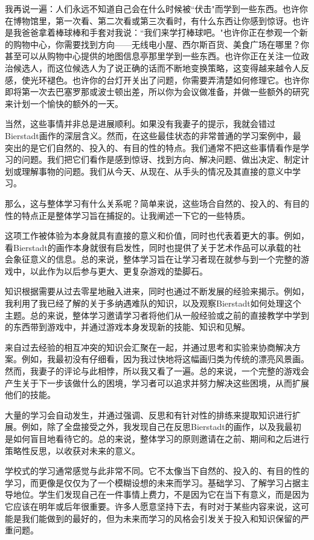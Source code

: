 我再说一遍：人们永远不知道自己会在什么时候被``伏击"而学到一些东西。也许你在博物馆里，第一次看、第二次看或第三次看时，有什么东西让你感到惊讶。也许是我爸爸拿着棒球棒和手套对我说：``我们来学打棒球吧。"也许你正在参观一个新的购物中心，你需要找到方向——无线电小屋、西尔斯百货、美食广场在哪里？你甚至可以从购物中心提供的地图信息亭那里学到一些东西。也许你正在关注一位政治候选人，而这位候选人为了说正确的话而不断地变换策略，这变得越来越令人反感，使光环褪色。也许你的台灯开关出了问题，你需要弄清楚如何修理它。也许你即将第一次去巴塞罗那或波士顿出差，所以你为会议做准备，并做一些额外的研究来计划一个愉快的额外的一天。

当然，这些事情并非总是进展顺利。如果没有我妻子的提示，我就会错过Bierstadt画作的深层含义。然而，在这些最佳状态的非常普通的学习案例中，最突出的是它们自然的、投入的、有目的性的特点。我们通常不把这些事情看作是学习的问题。我们把它们看作是感到惊讶、找到方向、解决问题、做出决定、制定计划或理解事物的问题。我们从今天、从现在、从手头的情况及其直接的意义中学习。

那么，这与整体学习有什么关系呢？简单来说，这些场合自然的、投入的、有目的性的特点正是整体学习旨在捕捉的。让我阐述一下它的一些特质。

这项工作被体验为本身就具有直接的意义和价值，同时也代表着更大的事。例如，看Bierstadt的画作本身就很有启发性，同时也提供了关于艺术作品可以承载的社会象征意义的信息。总的来说，整体学习旨在让学习者现在就参与到一个完整的游戏中，以此作为以后参与更大、更复杂游戏的垫脚石。

知识根据需要从过去零星地融入进来，同时也通过不断发展的经验来揭示。例如，我利用了我已经了解的关于多纳遇难队的知识，以及观察Bierstadt如何处理这个主题。总的来说，整体学习邀请学习者将他们从一般经验或之前的直接教学中学到的东西带到游戏中，并通过游戏本身发现新的技能、知识和见解。

来自过去经验的相互冲突的知识会汇聚在一起，并通过思考和实验来协商解决方案。例如，我最初没有仔细看，因为我过快地将这幅画归类为传统的漂亮风景画。然而，我妻子的评论与此相悖，所以我又看了一遍。总的来说，一个完整的游戏会产生关于下一步该做什么的困境，学习者可以追求并努力解决这些困境，从而扩展他们的技能。

大量的学习会自动发生，并通过强调、反思和有针对性的排练来提取知识进行扩展。例如，除了全盘接受之外，我发现自己在反思Bierstadt的画作，以及我最初是如何盲目地看待它的。总的来说，整体学习的原则邀请在之前、期间和之后进行策略性反思，以收获对未来的意义。

学校式的学习通常感觉与此非常不同。它不太像当下自然的、投入的、有目的性的学习，而更像是仅仅为了一个模糊设想的未来而学习。基础学习、了解学习占据主导地位。学生们发现自己在一件事情上费力，不是因为它在当下有意义，而是因为它应该在明年或后年很重要。许多人愿意坚持下去，有时对于某些内容来说，这可能是我们能做到的最好的，但为未来而学习的风格会引发关于投入和知识保留的严重问题。


